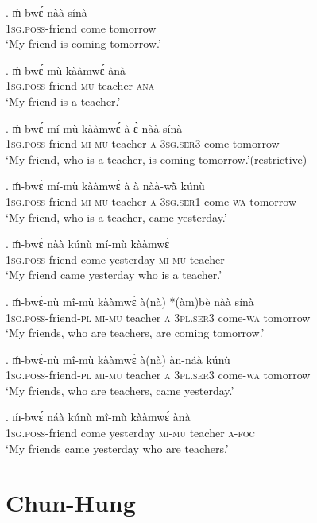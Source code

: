 \documentclass{assets/fieldnotes}
\begin{document}
\exg. ḿ̩-bwɛ́ nàà sínà\\
\textsc{1sg.poss}-friend come tomorrow\\
`My friend is coming tomorrow.’

\exg. ḿ̩-bwɛ́ mù kààmwɛ́ ànà\\
\textsc{1sg.poss}-friend \textsc{mu} teacher \textsc{ana}\\
`My friend is a teacher.’

\exg. ḿ̩-bwɛ́ mí-mù kààmwɛ́ à ɛ̀ nàà sínà\\
\textsc{1sg.poss}-friend \textsc{mi-mu} teacher \textsc{a} \textsc{3sg.ser3} come tomorrow\\
`My friend, who is a teacher, is coming tomorrow.’\hfill{(restrictive)}

\exg. ḿ̩-bwɛ́ mí-mù kààmwɛ́ à à nàà-wã̀ kúnù\\
\textsc{1sg.poss}-friend \textsc{mi-mu} teacher \textsc{a} \textsc{3sg.ser1} come-\textsc{wa} tomorrow\\
`My friend, who is a teacher, came yesterday.’

\exg. ḿ̩-bwɛ́ nàà kúnù mí-mù kààmwɛ́\\
\textsc{1sg.poss}-friend come yesterday \textsc{mi-mu} teacher\\
`My friend came yesterday who is a teacher.’

\exg. ḿ̩-bwɛ́-nù mî-mù kààmwɛ́ à(nà) *(àm)bè nàà sínà\\
\textsc{1sg.poss}-friend-\textsc{pl} \textsc{mi-mu} teacher \textsc{a} \textsc{3pl.ser3} come-\textsc{wa} tomorrow\\
`My friends, who are teachers, are coming tomorrow.’

\exg. ḿ̩-bwɛ́-nù mî-mù kààmwɛ́ à(nà) àn-náà kúnù\\
\textsc{1sg.poss}-friend-\textsc{pl} \textsc{mi-mu} teacher \textsc{a} \textsc{3pl.ser3} come-\textsc{wa} tomorrow\\
`My friends, who are teachers, came yesterday.’

\exg. ḿ̩-bwɛ́ náà kúnù mî-mù kààmwɛ́ ànà\\
\textsc{1sg.poss}-friend come yesterday \textsc{mi-mu} teacher \textsc{a-foc}\\
`My friends came yesterday who are teachers.’


\section{Chun-Hung}
\end{document}
